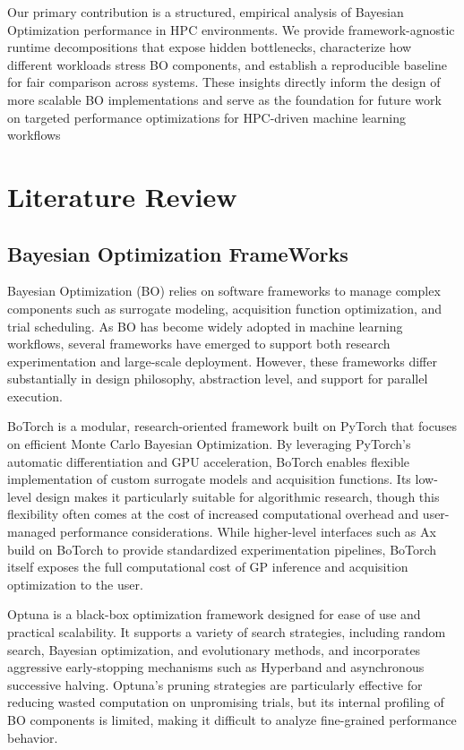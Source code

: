 \documentclass[11pt]{article}
\begin{document}
Our primary contribution is a structured, empirical analysis of Bayesian Optimization performance in HPC environments. We provide framework-agnostic runtime decompositions that expose hidden bottlenecks, characterize how different workloads stress BO components, and establish a reproducible baseline for fair comparison across systems. These insights directly inform the design of more scalable BO implementations and serve as the foundation for future work on targeted performance optimizations for HPC-driven machine learning workflows

\section{Literature Review}
\subsection{Bayesian Optimization FrameWorks}
Bayesian Optimization (BO) relies on software frameworks to manage complex components such as surrogate modeling, acquisition function optimization, and trial scheduling. As BO has become widely adopted in machine learning workflows, several frameworks have emerged to support both research experimentation and large-scale deployment. However, these frameworks differ substantially in design philosophy, abstraction level, and support for parallel execution.

BoTorch is a modular, research-oriented framework built on PyTorch that focuses on efficient Monte Carlo Bayesian Optimization. By leveraging PyTorch’s automatic differentiation and GPU acceleration, BoTorch enables flexible implementation of custom surrogate models and acquisition functions. Its low-level design makes it particularly suitable for algorithmic research, though this flexibility often comes at the cost of increased computational overhead and user-managed performance considerations. While higher-level interfaces such as Ax build on BoTorch to provide standardized experimentation pipelines, BoTorch itself exposes the full computational cost of GP inference and acquisition optimization to the user.


Optuna is a black-box optimization framework designed for ease of use and practical scalability. It supports a variety of search strategies, including random search, Bayesian optimization, and evolutionary methods, and incorporates aggressive early-stopping mechanisms such as Hyperband and asynchronous successive halving. Optuna’s pruning strategies are particularly effective for reducing wasted computation on unpromising trials, but its internal profiling of BO components is limited, making it difficult to analyze fine-grained performance behavior.
\end{document}
